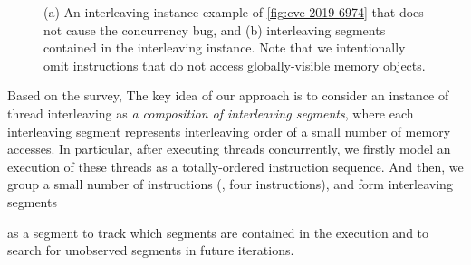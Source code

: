 %
\begin{figure}[t]
  \hfill
  \caption{(a) An interleaving instance example of
    \autoref{fig:cve-2019-6974} that does not cause the concurrency
    bug, and (b) interleaving segments contained in the interleaving
    instance. Note that we intentionally omit instructions that do not
    access globally-visible memory objects.}
  \label{fig:keyidea}
\end{figure}
%
Based on the survey, The key idea of our approach is to consider an
instance of thread interleaving as \textit{a composition of
  interleaving segments}, where each interleaving segment represents
interleaving order of a small number of memory accesses.
%
In particular, after executing threads concurrently, we firstly model
an execution of these threads as a totally-ordered instruction
sequence.
%
And then, we group a small number of instructions (\eg, four
instructions), and form interleaving segments

as a segment to track which segments are contained in
the execution and to search for unobserved segments in future
iterations.


